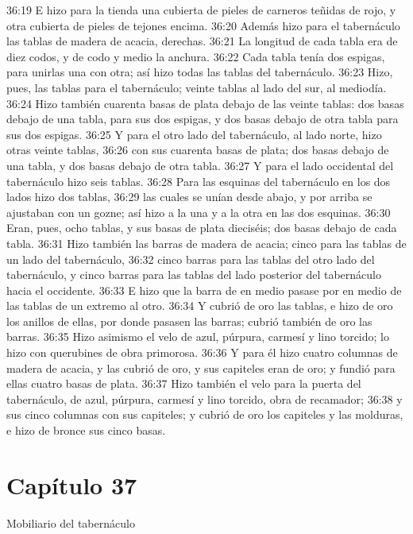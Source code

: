 36:19 E hizo para la tienda una cubierta de pieles de carneros teñidas de rojo, y otra cubierta de pieles de tejones encima. 
36:20 Además hizo para el tabernáculo las tablas de madera de acacia, derechas. 
36:21 La longitud de cada tabla era de diez codos, y de codo y medio la anchura. 
36:22 Cada tabla tenía dos espigas, para unirlas una con otra; así hizo todas las tablas del tabernáculo. 
36:23 Hizo, pues, las tablas para el tabernáculo; veinte tablas al lado del sur, al mediodía. 
36:24 Hizo también cuarenta basas de plata debajo de las veinte tablas: dos basas debajo de una tabla, para sus dos espigas, y dos basas debajo de otra tabla para sus dos espigas. 
36:25 Y para el otro lado del tabernáculo, al lado norte, hizo otras veinte tablas, 
36:26 con sus cuarenta basas de plata; dos basas debajo de una tabla, y dos basas debajo de otra tabla. 
36:27 Y para el lado occidental del tabernáculo hizo seis tablas. 
36:28 Para las esquinas del tabernáculo en los dos lados hizo dos tablas, 
36:29 las cuales se unían desde abajo, y por arriba se ajustaban con un gozne; así hizo a la una y a la otra en las dos esquinas. 
36:30 Eran, pues, ocho tablas, y sus basas de plata dieciséis; dos basas debajo de cada tabla. 
36:31 Hizo también las barras de madera de acacia; cinco para las tablas de un lado del tabernáculo, 
36:32 cinco barras para las tablas del otro lado del tabernáculo, y cinco barras para las tablas del lado posterior del tabernáculo hacia el occidente. 
36:33 E hizo que la barra de en medio pasase por en medio de las tablas de un extremo al otro. 
36:34 Y cubrió de oro las tablas, e hizo de oro los anillos de ellas, por donde pasasen las barras; cubrió también de oro las barras. 
36:35 Hizo asimismo el velo de azul, púrpura, carmesí y lino torcido; lo hizo con querubines de obra primorosa. 
36:36 Y para él hizo cuatro columnas de madera de acacia, y las cubrió de oro, y sus capiteles eran de oro; y fundió para ellas cuatro basas de plata. 
36:37 Hizo también el velo para la puerta del tabernáculo, de azul, púrpura, carmesí y lino torcido, obra de recamador; 
36:38 y sus cinco columnas con sus capiteles; y cubrió de oro los capiteles y las molduras, e hizo de bronce sus cinco basas. 
\section*{Capítulo 37}
Mobiliario del tabernáculo  

